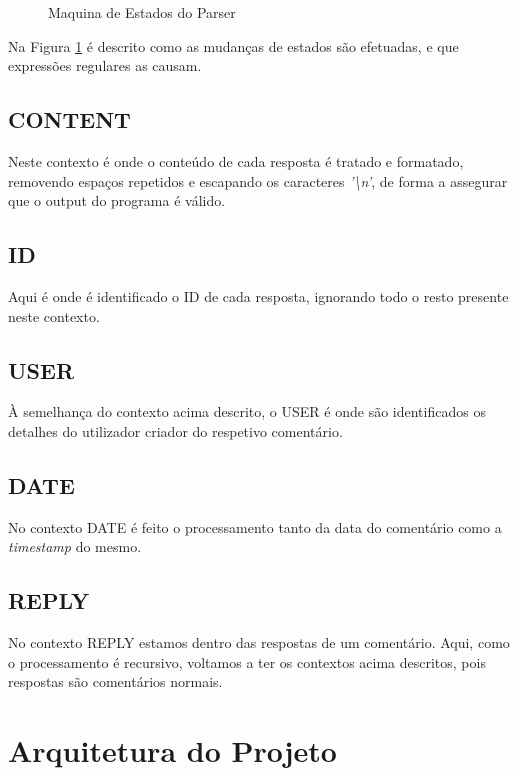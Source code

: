 \documentclass[a4paper]{report}
\begin{document}
\begin{figure}[H]
    
    \caption{Maquina de Estados do Parser}\label{fig:parser_state_machine}
\end{figure}

Na Figura \ref{fig:parser_state_machine} é descrito como as mudanças de
estados são efetuadas, e que expressões regulares as causam.
\pagebreak

\subsection{CONTENT}

Neste contexto é onde o conteúdo de cada resposta é tratado e formatado,
removendo espaços repetidos e escapando os caracteres \textit{'\textbackslash n'},
de forma a assegurar que o output do programa é válido.

\subsection{ID}

Aqui é onde é identificado o ID de cada resposta, ignorando todo o resto
presente neste contexto.

\subsection{USER}

À semelhança do contexto acima descrito, o USER é onde são identificados
os detalhes do utilizador criador do respetivo comentário.

\subsection{DATE}

No contexto DATE é feito o processamento tanto da data do comentário como
a \textit{timestamp} do mesmo.

\subsection{REPLY}

No contexto REPLY estamos dentro das respostas de um comentário. Aqui,
como o processamento é recursivo, voltamos a ter os contextos acima descritos,
pois respostas são comentários normais.

\section{Arquitetura do Projeto}
\end{document}
